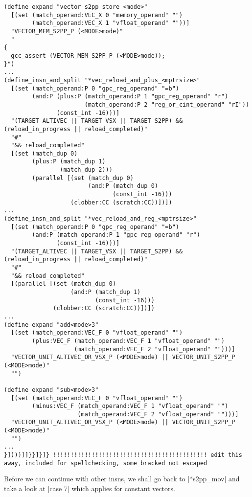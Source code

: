 \begin{lstlisting}
(define_expand "vector_s2pp_store_<mode>"
  [(set (match_operand:VEC_X 0 "memory_operand" "")
        (match_operand:VEC_X 1 "vfloat_operand" ""))]
  "VECTOR_MEM_S2PP_P (<MODE>mode)"
  "
{
  gcc_assert (VECTOR_MEM_S2PP_P (<MODE>mode));
}")
...
(define_insn_and_split "*vec_reload_and_plus_<mptrsize>"
  [(set (match_operand:P 0 "gpc_reg_operand" "=b")
        (and:P (plus:P (match_operand:P 1 "gpc_reg_operand" "r")
                       (match_operand:P 2 "reg_or_cint_operand" "rI"))
               (const_int -16)))]
  "(TARGET_ALTIVEC || TARGET_VSX || TARGET_S2PP) && (reload_in_progress || reload_completed)"
  "#"
  "&& reload_completed"
  [(set (match_dup 0)
        (plus:P (match_dup 1)
                (match_dup 2)))
        (parallel [(set (match_dup 0)
                        (and:P (match_dup 0)
                               (const_int -16)))
                   (clobber:CC (scratch:CC))])])
...
(define_insn_and_split "*vec_reload_and_reg_<mptrsize>"
  [(set (match_operand:P 0 "gpc_reg_operand" "=b")
        (and:P (match_operand:P 1 "gpc_reg_operand" "r")
               (const_int -16)))]
  "(TARGET_ALTIVEC || TARGET_VSX || TARGET_S2PP) && (reload_in_progress || reload_completed)"
  "#"
  "&& reload_completed"
  [(parallel [(set (match_dup 0)
                   (and:P (match_dup 1)
                          (const_int -16)))
              (clobber:CC (scratch:CC))])])
...
(define_expand "add<mode>3"
  [(set (match_operand:VEC_F 0 "vfloat_operand" "")
        (plus:VEC_F (match_operand:VEC_F 1 "vfloat_operand" "")
                    (match_operand:VEC_F 2 "vfloat_operand" "")))]
  "VECTOR_UNIT_ALTIVEC_OR_VSX_P (<MODE>mode) || VECTOR_UNIT_S2PP_P (<MODE>mode)"
  "")

(define_expand "sub<mode>3"
  [(set (match_operand:VEC_F 0 "vfloat_operand" "")
        (minus:VEC_F (match_operand:VEC_F 1 "vfloat_operand" "")
                     (match_operand:VEC_F 2 "vfloat_operand" "")))]
  "VECTOR_UNIT_ALTIVEC_OR_VSX_P (<MODE>mode) || VECTOR_UNIT_S2PP_P (<MODE>mode)"
  "")
...
}])))]]}}]}]} !!!!!!!!!!!!!!!!!!!!!!!!!!!!!!!!!!!!!!!!!!!! edit this away, included for spellchecking, some bracked not escaped
\end{lstlisting}

Before we can continue with other insns, we shall go back to |*s2pp_mov| and take a look at |case 7| which applies for constant vectors.

